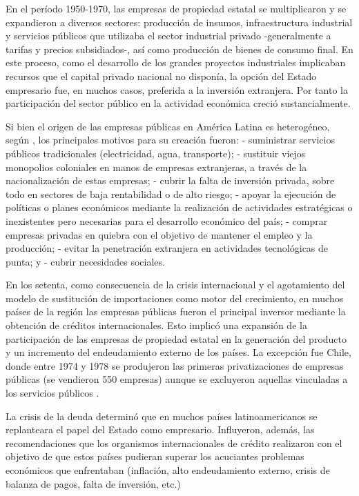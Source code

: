 \documentclass[
  12pt,
  spanish,
]{book}
\begin{document}
En el período 1950-1970, las empresas de propiedad estatal se multiplicaron y se expandieron a diversos sectores: producción de insumos, infraestructura industrial y servicios públicos que utilizaba el sector industrial privado -generalmente a tarifas y precios subsidiados-, así como producción de bienes de consumo final. En este proceso, como el desarrollo de los grandes proyectos industriales implicaban recursos que el capital privado nacional no disponía, la opción del Estado empresario fue, en muchos casos, preferida a la inversión extranjera. Por tanto la participación del sector público en la actividad económica creció sustancialmente.

Si bien el origen de las empresas públicas en América Latina es heterogéneo, según \citet{Morales1990}, los principales motivos para su creación fueron:
- suministrar servicios públicos tradicionales (electricidad, agua, transporte);
- sustituir viejos monopolios coloniales en manos de empresas extranjeras, a través de la nacionalización de estas empresas;
- cubrir la falta de inversión privada, sobre todo en sectores de baja rentabilidad o de alto riesgo;
- apoyar la ejecución de políticas o planes económicos mediante la realización de actividades estratégicas o inexistentes pero necesarias para el desarrollo económico del país;
- comprar empresas privadas en quiebra con el objetivo de mantener el empleo y la producción;
- evitar la penetración extranjera en actividades tecnológicas de punta; y
- cubrir necesidades sociales.

En los setenta, como consecuencia de la crisis internacional y el agotamiento del modelo de sustitución de importaciones como motor del crecimiento, en muchos países de la región las empresas públicas fueron el principal inversor mediante la obtención de créditos internacionales. Esto implicó una expansión de la participación de las empresas de propiedad estatal en la generación del producto y un incremento del endeudamiento externo de los países. La excepción fue Chile, donde entre 1974 y 1978 se produjeron las primeras privatizaciones de empresas públicas (se vendieron 550 empresas) aunque se excluyeron aquellas vinculadas a los servicios públicos \citep{Estache2004}.

La crisis de la deuda determinó que en muchos países latinoamericanos se replanteara el papel del Estado como empresario. Influyeron, además, las recomendaciones que los organismos internacionales de crédito realizaron con el objetivo de que estos países pudieran superar los acuciantes problemas económicos que enfrentaban (inflación, alto endeudamiento externo, crisis de balanza de pagos, falta de inversión, etc.)
\end{document}
